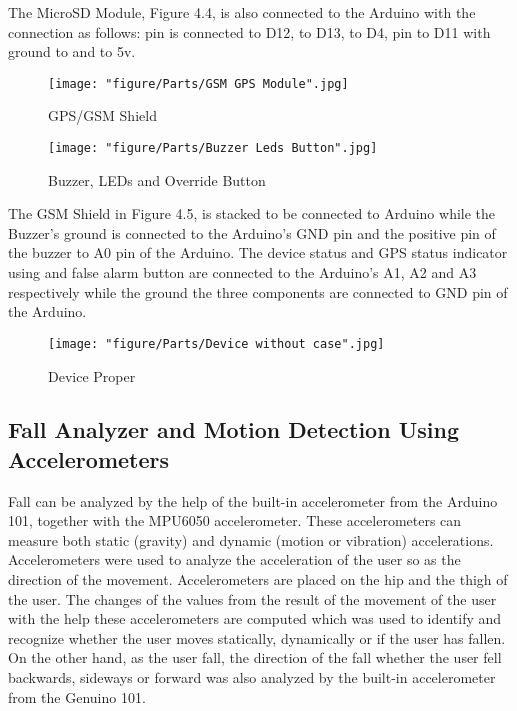 The MicroSD Module, Figure 4.4, is also connected to the Arduino with the connection as follows:  pin is connected to D12,  to D13,  to D4,  pin to D11 with ground to  and  to 5v.

\begin{figure}[htbp]
	\centering
		\texttt{[image: "figure/Parts/GSM GPS Module".jpg]}
	\caption{GPS/GSM Shield}
	\label{fig:GSM GPS Module}
\end{figure}

\begin{figure}[htbp]
	\centering
		\texttt{[image: "figure/Parts/Buzzer Leds Button".jpg]}
	\caption{Buzzer, LEDs and Override Button}
	\label{fig:Buzzer Leds Button}
\end{figure}

The GSM Shield in Figure 4.5, is stacked to be connected to Arduino while the Buzzer’s ground is connected to the Arduino’s GND pin and the positive pin of the buzzer to A0 pin of the Arduino. The device status and GPS status indicator using  and false alarm button are connected to the Arduino’s A1, A2 and A3 respectively while the ground the three components are connected to GND pin of the Arduino.

\begin{figure}[htbp]
	\centering
		\texttt{[image: "figure/Parts/Device without case".jpg]}
	\caption{Device Proper}
	\label{fig:Device without case}
\end{figure}

\subsection{Fall Analyzer and Motion Detection Using Accelerometers}

Fall can be analyzed by the help of the built-in accelerometer from the Arduino 101, together with the MPU6050 accelerometer. These accelerometers can measure both static (gravity) and dynamic (motion or vibration) accelerations. \cite{Saf18} %
Accelerometers were used to analyze the acceleration of the user so as the direction of the movement. Accelerometers are placed on the hip and the thigh of the user. The changes of the values from the result of the movement of the user with the help these accelerometers are computed which was used to identify and recognize whether the user moves statically, dynamically or if the user has fallen. On the other hand, as the user fall, the direction of the fall whether the user fell backwards, sideways or forward was also analyzed by the built-in accelerometer from the Genuino 101.

